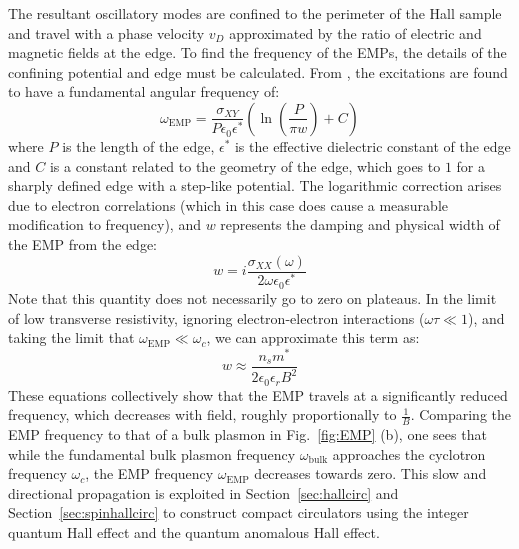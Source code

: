 The resultant oscillatory modes are confined to the perimeter of the Hall sample and travel with a phase velocity $v_D$ approximated by the ratio
of electric and magnetic fields at the edge. To find the frequency of the EMPs, the details of the confining potential and edge must be calculated.
From \cite{1988ZhETF..94..217V}, the excitations are found to have a fundamental angular frequency of:
\begin{equation}
  \omega_{\textrm{EMP}} = \frac{\sigma_{XY}}{P\epsilon_0\epsilon^*}\left(\ln\left(\frac{P}{\pi w}\right) + C\right)
\end{equation}
where $P$ is the length of the edge, $\epsilon^*$ is the effective dielectric constant of the edge and $C$ is a constant related to the
geometry of the edge, which goes to $1$ for a sharply defined edge with a step-like potential. The logarithmic correction arises due to
electron correlations (which in this case does cause a measurable modification to frequency), and $w$ represents the damping and physical
width of the EMP from the edge:
\begin{equation}
  w = i\frac{\sigma_{XX}(\omega)}{2\omega\epsilon_0\epsilon^*}
\end{equation}
Note that this quantity does not necessarily go to zero on plateaus.
In the limit of low transverse resistivity, ignoring electron-electron interactions ($\omega\tau \ll 1$), and taking the limit
that $\omega_{\textrm{EMP}} \ll \omega_c$, we can approximate this term as:
\begin{equation}
  w \approx \frac{n_sm^*}{2\epsilon_0\epsilon_r B^2}
\end{equation}
These equations collectively show that the EMP travels at a significantly reduced frequency, which decreases with field, roughly proportionally to $\tfrac{1}{B}$.
Comparing the EMP frequency to that of a bulk plasmon in Fig.~\ref{fig:EMP} (b), one sees that while the fundamental bulk plasmon frequency $\omega_\textrm{bulk}$
approaches the cyclotron frequency $\omega_c$, the EMP frequency $\omega_\textrm{EMP}$ decreases towards zero. This slow and directional propagation is exploited in
Section~\ref{sec:hallcirc} and Section~\ref{sec:spinhallcirc} to construct compact circulators using the integer quantum Hall effect and the quantum anomalous Hall effect.

